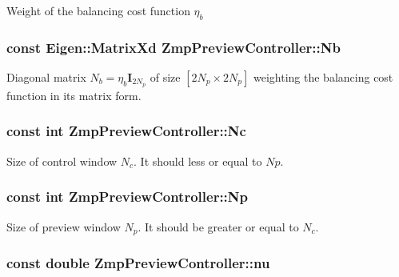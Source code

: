 \-Weight of the balancing cost function $ \eta_b $ \hypertarget{classZmpPreviewController_abd345d397e99ae01ad4ea80cd9894802}{
\subsubsection[{\-Nb}]{\setlength{\rightskip}{0pt plus 5cm}const \-Eigen\-::\-Matrix\-Xd {\bf \-Zmp\-Preview\-Controller\-::\-Nb}}}\label{classZmpPreviewController_abd345d397e99ae01ad4ea80cd9894802}
\-Diagonal matrix $N_b = \eta_b\mathbf{I}_{2N_p}$ of size $[2N_p \times 2N_p]$ weighting the balancing cost function in its matrix form. \hypertarget{classZmpPreviewController_af0c8b4aa92a6e3e95f80d81a8c91f693}{
\subsubsection[{\-Nc}]{\setlength{\rightskip}{0pt plus 5cm}const int {\bf \-Zmp\-Preview\-Controller\-::\-Nc}}}\label{classZmpPreviewController_af0c8b4aa92a6e3e95f80d81a8c91f693}
\-Size of control window $ N_c $. \-It should less or equal to $Np$. \hypertarget{classZmpPreviewController_a2de373daf73b4c28f4b6387787bd27e2}{
\subsubsection[{\-Np}]{\setlength{\rightskip}{0pt plus 5cm}const int {\bf \-Zmp\-Preview\-Controller\-::\-Np}}}\label{classZmpPreviewController_a2de373daf73b4c28f4b6387787bd27e2}
\-Size of preview window $ N_p $. \-It should be greater or equal to $N_c$. \hypertarget{classZmpPreviewController_ac611f084023404faba1ccfab573cd81d}{
\subsubsection[{nu}]{\setlength{\rightskip}{0pt plus 5cm}const double {\bf \-Zmp\-Preview\-Controller\-::nu}}}\label{classZmpPreviewController_ac611f084023404faba1ccfab573cd81d}
